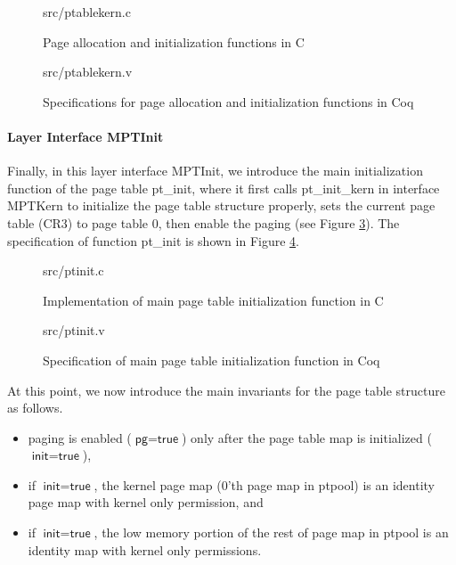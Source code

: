 \begin{figure}
	 {src/ptablekern.c}
	\caption{Page allocation and initialization functions in C}
	\label{fig:ptablekern_c}
\end{figure}

\begin{figure}
	 {src/ptablekern.v}
	\caption{Specifications for page allocation and initialization functions in Coq}
	\label{fig:ptablekern_v}
\end{figure}

\paragraph{Layer Interface MPTInit}

Finally, in this layer interface MPTInit, we introduce the main initialization function of the page table
\textsf{pt\_init}, where it first calls \textsf{pt\_init\_kern} in interface MPTKern to initialize the 
page table structure properly, sets the current page table (CR3) to page table 0, then enable
the paging (see Figure \ref{fig:ptinit_c}).
The specification of function \textsf{pt\_init} is shown in Figure \ref{fig:ptinit_v}.

\begin{figure}
	 {src/ptinit.c}
	\caption{Implementation of main page table initialization function in C}
	\label{fig:ptinit_c}
\end{figure}

\begin{figure}
	 {src/ptinit.v}
	\caption{Specification of main page table initialization function in Coq}
	\label{fig:ptinit_v}
\end{figure}

At this point, we now introduce the main invariants for the page table structure as follows.

\begin{invariant}
\begin{itemize}
\item paging is enabled ($\textsf{pg}=\textsf{true}$) only after the page table map is initialized ($\textsf{init}=\textsf{true}$),
\item if $\textsf{init}=\textsf{true}$, the kernel page map (0'th page map in \textsf{ptpool}) is an identity page map with kernel only permission, and
\item if $\textsf{init}=\textsf{true}$, the low memory portion of the rest of page map in \textsf{ptpool} is an identity map with kernel only permissions.
\end{itemize}
\end{invariant}

